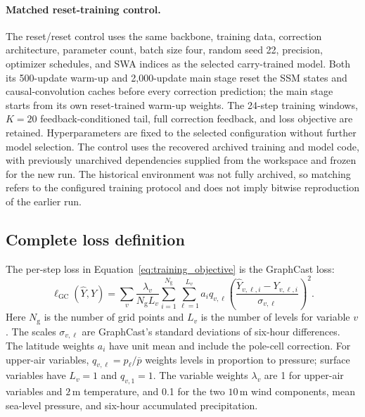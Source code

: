 \documentclass[11pt]{article}
\begin{document}
\paragraph{Matched reset-training control.}

The reset/reset control uses the same backbone, training data, correction architecture, parameter count, batch size four, random seed 22, precision, optimizer schedules, and SWA indices as the selected carry-trained model. Both its 500-update warm-up and 2,000-update main stage reset the SSM states and causal-convolution caches before every correction prediction; the main stage starts from its own reset-trained warm-up weights. The 24-step training windows, $K=20$ feedback-conditioned tail, full correction feedback, and loss objective are retained. Hyperparameters are fixed to the selected configuration without further model selection. The control uses the recovered archived training and model code, with previously unarchived dependencies supplied from the workspace and frozen for the new run. The historical environment was not fully archived, so matching refers to the configured training protocol and does not imply bitwise reproduction of the earlier run.

\subsection{Complete loss definition}
\label{app:training_loss}
The per-step loss in Equation~\ref{eq:training_objective} is the {GraphCast loss}:
\begin{equation}
    \ell_{\mathrm{GC}}(\hat{Y},Y)
    =\sum_v\frac{\lambda_v}{N_{\mathrm{g}}L_v}
      \sum_{i=1}^{N_{\mathrm{g}}}\sum_{\ell=1}^{L_v}
      a_i q_{v,\ell}
      \left(\frac{\hat{Y}_{v,\ell,i}-Y_{v,\ell,i}}
      {\sigma_{v,\ell}}\right)^2.
    \label{eq:training_gc_loss}
\end{equation}
Here $N_{\mathrm{g}}$ is the number of grid points and $L_v$ is the number of levels for variable $v$. The scales $\sigma_{v,\ell}$ are GraphCast's standard deviations of six-hour differences. The latitude weights $a_i$ have unit mean and include the pole-cell correction. For upper-air variables, $q_{v,\ell}=p_\ell/\overline{p}$ weights levels in proportion to pressure; surface variables have $L_v=1$ and $q_{v,1}=1$. The variable weights $\lambda_v$ are 1 for upper-air variables and $2$\,m temperature, and 0.1 for the two $10$\,m wind components, mean sea-level pressure, and six-hour accumulated precipitation.
\end{document}
